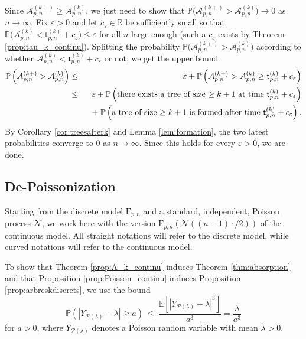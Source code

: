 \documentclass[a4, 11pt]{article}
\numberwithin{equation}{section}
\theoremstyle{plain}
\theoremstyle{definition}
\theoremstyle{remark}
\begin{document}
Since $\mathcal A^{(k+)}_{p,n} \geq \mathcal A_{p,n}^{(k)}$, we just need to show that $\mathbb P\big(\mathcal A^{(k+)}_{p,n} > \mathcal A_{p,n}^{(k)}\big) \rightarrow 0$ as $n \rightarrow \infty$. 
Fix $\varepsilon>0$ and let $c_{\varepsilon} \in \mathbb R$ be sufficiently small so that $\mathbb P\big(\mathcal A_{p,n}^{(k)}<\mathsf t^{(k)}_{p,n}+c_{\varepsilon}  \big) \leq \varepsilon$ for all $n$ large enough (such a  $c_{\varepsilon}$ exists by Theorem \ref{prop:tau_k_continu}).
Splitting the probability $\mathbb P\big(\mathcal A^{(k+)}_{p,n} > \mathcal A_{p,n}^{(k)}\big)$ according to whether $\mathcal A_{p,n}^{(k)}<\mathsf t^{(k)}_{p,n}+c_{\varepsilon} $ or not, we get the upper bound 
\begin{eqnarray*}
\mathbb P\left(\mathcal A^{(k+)}_{p,n} > \mathcal A_{p,n}^{(k)}\right) &\leq&   \varepsilon+ \mathbb P\left(\mathcal A^{(k+)}_{p,n} > \mathcal A_{p,n}^{(k)}  \geq \mathsf t^{(k)}_{p,n}+c_{\varepsilon} \right)\\
&\leq&  \varepsilon+ \mathbb P\left(\text{there exists a tree of size $\geq k+1$ at time }\mathsf t^{(k)}_{p,n} +c_{\varepsilon}\right) \\
&& \hspace{0.25cm} + \;  \mathbb P\left( \text{a tree of size $\geq k+1$ is formed after time }\mathsf t^{(k)}_{p,n} +c_{\varepsilon} \right).
\end{eqnarray*}
By Corollary \ref{cor:treesafterk} and Lemma \ref{lem:formation}, the two latest probabilities converge to 0 as $n \rightarrow \infty$. Since this holds for every $\varepsilon>0$, we are done.

\subsection{De-Poissonization}
\label{sec:dePoisson}

Starting from the discrete model $\mathrm{F}_{p,n}$ and a standard, independent, Poisson process $\mathcal N$, we work here with the version $\mathrm{F}_{p,n}(\mathcal N((n-1) \cdot /2))$ of the continuous model. All straight notations will refer to the discrete model, while curved notations will refer to the continuous model. 

To show that Theorem \ref{prop:A_k_continu} induces Theorem \ref{thm:absorption} and that Proposition \ref{prop:Poisson_continu} induces Proposition \ref{prop:arbreskdiscrets}, we use the bound
\begin{equation}
\label{bound:Poisson}
\mathbb P\left(|Y_{\mathcal P(\lambda)}-\lambda| \geq a \right)~\leq~\frac{\mathbb E[|Y_{\mathcal P(\lambda)}-\lambda|^3]}{a^3}=\frac{\lambda}{a^3}
\end{equation}
for $a>0$, where $Y_{\mathcal P(\lambda)}$ denotes a Poisson random variable with mean $\lambda>0$. 
\end{document}
